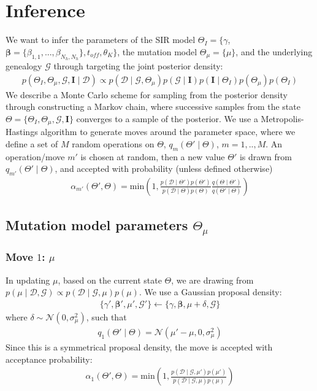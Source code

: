 \documentclass[]{report}
\begin{document}
\section{Inference}
We want to infer the parameters of the SIR model $\Theta_{I} = \{\gamma$, $\boldsymbol{\beta}= \{\beta_{1,1},...,\beta_{N_h,N_h}\}, t_{off}, \theta_K\}$, the mutation model $\Theta_{\mu} = \{\mu\}$, and the underlying genealogy $\mathcal{G}$ through targeting the joint posterior density:
\begin{eqnarray}
p(\Theta_{I}, \Theta_{\mu}, \mathcal{G}, \mathbf{I} \mid \mathcal{D})\propto p(\mathcal{D}\mid \mathcal{G}, \Theta_{\mu})p(\mathcal{G}\mid \mathbf{I}) p(\mathbf{I} \mid \Theta_{I}) p(\Theta_{\mu}) p(\Theta_{I})
\end{eqnarray}
We describe a Monte Carlo scheme for sampling from the posterior density through constructing a Markov chain, where successive samples from the state $\Theta=\{\Theta_{I}, \Theta_{\mu}, \mathcal{G}, \mathbf{I} \}$ converges to a sample of the posterior. We use a Metropolis-Hastings algorithm to generate moves around the parameter space, where we define a set of $M$ random operations on $\Theta$, $q_m(\Theta'\mid \Theta)$, $m=1,..,M$. An operation/move $m'$ is chosen at random, then a new value $\Theta'$ is drawn from  $q_{m'}(\Theta'\mid \Theta)$, and accepted with probability (unless defined otherwise) 
\begin{eqnarray}
\alpha_{m'}(\Theta',\Theta)=\textrm{min}\left(1,\frac{p(\mathcal{D}\mid \Theta')p(\Theta')}{p(\mathcal{D}\mid \Theta)p(\Theta)} \frac{q(\Theta\mid\Theta')}{q(\Theta'\mid\Theta)}\right)
\end{eqnarray}
\subsection{Mutation model parameters $\Theta_{\mu}$} 
\subsubsection{Move $1$: $\mu$}
In updating $\mu$, based on the current state $\Theta$, we are drawing from $p(\mu\mid\mathcal{D},\mathcal{G}) \propto p(\mathcal{D}\mid \mathcal{G}, \mu)p(\mu)$. We use a Gaussian proposal density:
\begin{eqnarray}
\{\gamma', \boldsymbol{\beta}', \mu', \mathcal{G}'\}\leftarrow\{\gamma, \boldsymbol{\beta}, \mu+\delta, \mathcal{G}\}
\end{eqnarray}
where $\delta\sim\mathcal{N}(0,\sigma_{\mu}^2)$, such that 
\begin{eqnarray}
q_1(\Theta'\mid\Theta) = \mathcal{N}(\mu'-\mu,0,\sigma_{\mu}^2)
\end{eqnarray}
Since this is a symmetrical proposal density, the move is accepted with acceptance probability:
\begin{eqnarray}
\alpha_{1}(\Theta',\Theta)=\textrm{min}\left(1,\frac{p(\mathcal{D}\mid \mathcal{G}, \mu')p(\mu')}{p(\mathcal{D}\mid \mathcal{G}, \mu )p(\mu)} \right)
\end{eqnarray}
\end{document}

